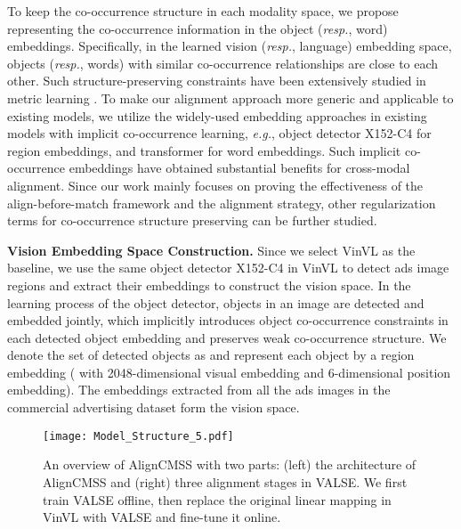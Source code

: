 \documentclass[letterpaper]{article} \usepackage{aaai24}  \usepackage{times}  \usepackage{helvet}  \usepackage{courier}  \usepackage[hyphens]{url}  \usepackage{graphicx} \urlstyle{rm} \def\UrlFont{\rm}  \usepackage{natbib}  \usepackage{caption} \frenchspacing  \setlength{\pdfpagewidth}{8.5in}  \setlength{\pdfpageheight}{11in}
\begin{document}
To keep the co-occurrence structure in each modality space, we propose representing the co-occurrence information in the object (\textit{resp.}, word) embeddings. Specifically, in the learned vision (\textit{resp.}, language) embedding space, objects (\textit{resp.}, words) with similar co-occurrence relationships are close to each other. Such structure-preserving constraints have been extensively studied in metric learning \cite{Wang_2016_CVPR, liu2021semantic}. To make our alignment approach more generic and applicable to existing models, we utilize the widely-used embedding approaches in existing models with implicit co-occurrence learning, \textit{e.g.}, object detector X152-C4 for region embeddings, and transformer for word embeddings. Such implicit co-occurrence embeddings have obtained substantial benefits for cross-modal alignment. Since our work mainly focuses on proving the effectiveness of the align-before-match framework and the alignment strategy, other regularization terms for co-occurrence structure preserving can be further studied.      

\noindent\textbf{Vision Embedding Space Construction.} Since we select VinVL as the baseline, we use the same object detector X152-C4 \cite{zhang2021vinvl} in VinVL to detect ads image regions and extract their embeddings to construct the vision space. In the learning process of the object detector, objects in an image are detected and embedded jointly, which implicitly introduces object co-occurrence constraints in each detected object embedding and preserves weak co-occurrence structure.  We denote the set of detected objects as  and represent each object   by a region embedding   ( with 2048-dimensional visual embedding and 6-dimensional position embedding). The embeddings extracted from all the ads images in the commercial advertising dataset \cite{10.1145/3503161.3548226} form the vision space. 

\begin{figure*}
    \centering
    \vspace{5pt}
    \texttt{[image: Model\_Structure\_5.pdf]}   
    \caption{An overview of AlignCMSS with two parts: (left) the architecture of AlignCMSS and (right) three alignment stages in VALSE. We first train VALSE offline, then replace the original linear mapping in VinVL with VALSE and fine-tune it online. }
 \vspace{-10pt}
    \label{fig:model-architecture}
\end{figure*}
\end{document}
